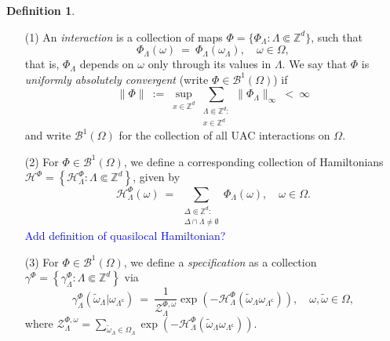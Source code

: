 \documentclass[12pt]{article}
\newcommand{\BB}{\mathscr{B}}
\renewcommand{\H}{\mathcal{H}}
\newcommand{\Z}{\mathbb{Z}}
\newcommand{\ZZ}{\mathcal{Z}}
\newcommand{\set}[1]{\left\{#1\right\}}
\newcommand{\1}{\mathbbm{1}}
\renewcommand{\c}{\mathsf{c}}
\newcommand{\5}{\vspace{0.5cm}}
\renewcommand{\tilde}{\widetilde}
\theoremstyle{definition}
\newtheorem{df}[thm]{Definition}
\begin{document}
\begin{df}~
\begin{itemize}
	\item[(1)] An \textit{interaction} is a collection of maps $\Phi=\{\Phi_\Lambda:\Lambda\Subset\Z^d\}$, such that
$$\Phi_\Lambda(\omega) ~=~ \Phi_\Lambda(\omega_\Lambda), \quad \omega\in\Omega,$$
that is, $\Phi_\Lambda$ depends on $\omega$ only through its values in $\Lambda$. We say that $\Phi$ is \textit{uniformly absolutely convergent} (write $\Phi\in\BB^1(\Omega)$) if 
$$\|\Phi\| ~:=~ \sup_{x\in\Z^d}\sum_{\substack{\Lambda\Subset\Z^d:\\x\in\Z^d}}\|\Phi_\Lambda\|_\infty ~<~ \infty$$
and write $\BB^1(\Omega)$ for the collection of all UAC interactions on $\Omega$.
	\item[(2)] For $\Phi\in\BB^1(\Omega)$, we define a corresponding collection of Hamiltonians $\H^\Phi=\set{\H_\Lambda^\Phi:\Lambda\Subset\Z^d}$, given by
	$$\H_\Lambda^\Phi(\omega) ~=~ \sum_{\substack{\Delta\Subset\Z^d:\\\Delta\cap\Lambda\neq\emptyset}}\Phi_\Lambda(\omega), \quad \omega\in\Omega.$$
	\textcolor{blue}{Add definition of quasilocal Hamiltonian?}
	\item[(3)] For $\Phi\in\BB^1(\Omega)$, we define a \textit{specification} as a collection $\gamma^\Phi=\set{\gamma_\Lambda^\Phi:\Lambda\Subset\Z^d}$ via
	$$\gamma_\Lambda^\Phi(\tilde{\omega}_\Lambda|\omega_{\Lambda^\c}) ~=~ \frac{1}{\ZZ_\Lambda^{\Phi,\omega}}\exp(-\H_\Lambda^\Phi(\tilde{\omega}_\Lambda\omega_{\Lambda^\c})), \quad \omega,\tilde{\omega}\in\Omega,$$
	where $\ZZ_\Lambda^{\Phi,\omega}=\sum_{\tilde{\omega}_\Lambda\in\Omega_\Lambda}\exp(-\H_\Lambda^\Phi(\tilde{\omega}_\Lambda\omega_{\Lambda^\c}))$.
\end{itemize}
\end{df}
\end{document}

